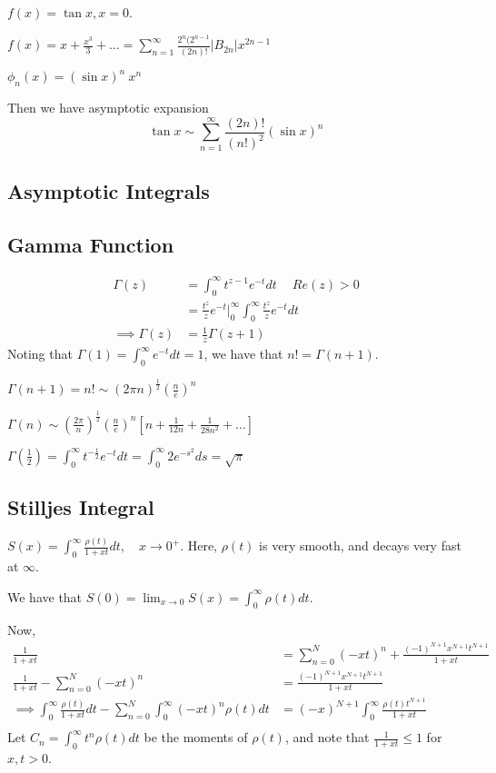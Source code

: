 \documentclass[a4paper]{article}
\begin{document}
\begin{ex}
	$f(x) = \tan x, x=0$.

	$f(x) = x + \frac{x^3}{3} + \ldots = \sum_{n=1}^{\infty}  \frac{2^{n} (2^{n-1}}{(2n)!} |B_{2n}| x^{2n-1}$

	$\phi_n(x) = (\sin x)^{n} ~x^{n}$ 

	Then we have asymptotic expansion
	\[
		\tan x \sim \sum_{n=1}^{\infty} \frac{(2n)!}{(n!)^{2}} (\sin x)^{n}
	\] 
\end{ex}

\subsection{Asymptotic Integrals}

\subsection*{Gamma Function}

\begin{align*}
	\Gamma(z) &= \int_{0}^{\infty} t^{z-1} e^{-t} dt\ \quad Re(z) > 0 \\
	&= \frac{t^{z}}{z} e^{-t} \big\rvert_{0}^{\infty} \int_{0}^{\infty} \frac{t^{z}}{z} e^{-t} dt \\
	\implies \Gamma(z) &= \frac{1}{z} \Gamma(z+1)
\end{align*}
Noting that $\Gamma(1) = \int_{0}^{\infty} e^{-t} dt =1$, we have that $n! = \Gamma(n+1)$.


$\Gamma(n+1) = n! \sim (2\pi n)^{\frac{1}{2}} (\frac{n}{e})^{n}$ 

$\Gamma(n) \sim (\frac{2\pi}{n})^{\frac{1}{2}} (\frac{n}{e})^{n}[n+\frac{1}{12n} + \frac{1}{28 n^2} + \ldots] $

$\Gamma(\frac{1}{2}) = \int_{0}^{\infty} t^{-\frac{1}{2}} e^{-t} dt = \int_{0}^{\infty} 2 e^{-s^2} ds = \sqrt{\pi} $

\subsection*{Stilljes Integral}

$S(x) = \int_{0}^{\infty} \frac{\rho(t)}{1+xt} dt,\quad x\to 0^{+}$.
Here, $\rho(t)$ is very smooth, and decays very fast at $\infty$.

We have that $S(0) = \lim_{x\to 0} S(x) = \int_{0}^{\infty} \rho(t) dt$. 

Now, \begin{align*}\frac{1}{1+xt} &= \sum_{n=0}^{N} (-xt)^{n} + \frac{(-1)^{N+1} x^{N+1} t^{N+1}}{1+xt} \\
	\frac{1}{1+xt} - \sum_{n=0}^{N} (-xt)^{n} &= \frac{(-1)^{N+1} x^{N+1} t^{N+1}}{1+x
t} \\
\implies \int_{0}^{\infty} \frac{\rho(t)}{1+xt}dt - \sum_{n=0}^{N} \int_{0}^{\infty} (-xt)^{n}\rho(t)dt &= (-x)^{N+1} \int_{0}^{\infty} \frac{\rho(t) t^{N+1}}{1+xt} \\	
\end{align*}
Let $C_n = \int_{0}^{\infty} t^{n} \rho(t) dt$ be the moments of $\rho(t)$, and note that  $\frac{1}{1+xt} \le 1$ for $x,t > 0$.
\end{document}

